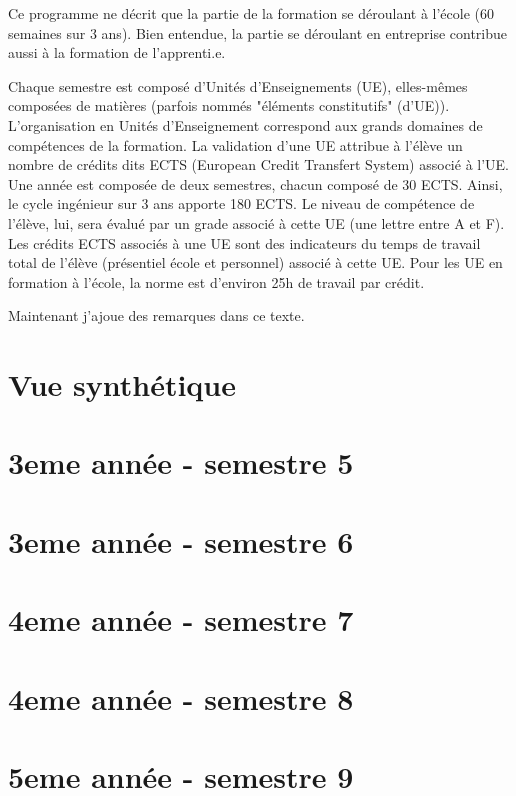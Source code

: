 \documentclass[a4paper, 11pt]{article}
\begin{document}
Ce programme ne décrit que la partie de la formation se déroulant à l'école (60 semaines sur 3 ans). Bien entendue, la partie se déroulant en entreprise contribue aussi à la formation de l'apprenti.e.

Chaque semestre est composé d'Unités d'Enseignements (UE), elles-mêmes composées de matières (parfois nommés "éléments constitutifs" (d'UE)). L'organisation en Unités d'Enseignement correspond aux grands domaines de compétences de la formation. La validation d'une UE attribue à l'élève un nombre de crédits dits ECTS (European Credit Transfert System) associé à l'UE. Une année est composée de deux semestres, chacun composé de 30 ECTS. Ainsi, le cycle ingénieur sur 3 ans apporte 180 ECTS. Le niveau de compétence de l'élève, lui, sera évalué par un grade associé à cette UE (une lettre entre A et F). Les crédits ECTS associés à une UE sont des indicateurs du temps de travail total de l'élève (présentiel école et personnel) associé à cette UE. Pour les UE en formation à l'école, la norme est d'environ 25h de travail par crédit.  

Maintenant j'ajoue des remarques dans ce texte.

\pagebreak

\tableofcontents
\pagebreak
\part{Vue synthétique}

\part{3eme année - semestre 5}





\part{3eme année - semestre 6}





\part{4eme année - semestre 7}





\part{4eme année - semestre 8}





\part{5eme année - semestre 9}




\end{document}
